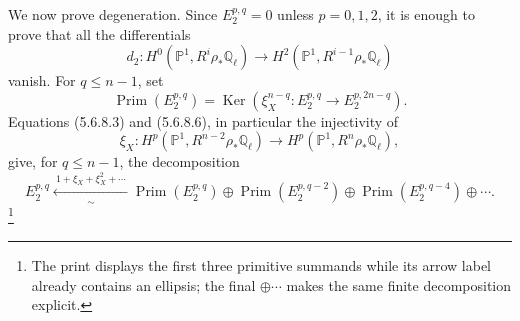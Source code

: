 We now prove degeneration.  Since $E_2^{p,q}=0$ unless $p=0,1,2$, it is
enough to prove that all the differentials
\[
d_2:H^0(\mathbb P^1,R^i\rho_*\mathbb Q_\ell)
\longrightarrow H^2(\mathbb P^1,R^{i-1}\rho_*\mathbb Q_\ell)
\]
vanish.  For $q\leq n-1$, set
\begin{equation}\tag{5.6.8.9}
\operatorname{Prim}(E_2^{p,q})
=\operatorname{Ker}\!\left(
\xi_X^{n-q}:E_2^{p,q}\longrightarrow E_2^{p,2n-q}
\right).
\end{equation}
Equations (5.6.8.3) and (5.6.8.6), in particular the injectivity of
\[
\xi_X:H^p(\mathbb P^1,R^{n-2}\rho_*\mathbb Q_\ell)
\longrightarrow H^p(\mathbb P^1,R^n\rho_*\mathbb Q_\ell),
\]
give, for $q\leq n-1$, the decomposition
\begin{equation}\tag{5.6.8.10}
E_2^{p,q}
\xleftarrow[\sim]{\ 1+\xi_X+\xi_X^2+\cdots\ }
\operatorname{Prim}(E_2^{p,q})
\oplus\operatorname{Prim}(E_2^{p,q-2})
\oplus\operatorname{Prim}(E_2^{p,q-4})
\oplus\cdots.
\end{equation}
\footnote{The print displays the first three primitive summands while its
arrow label already contains an ellipsis; the final $\oplus\cdots$ makes the
same finite decomposition explicit.}
